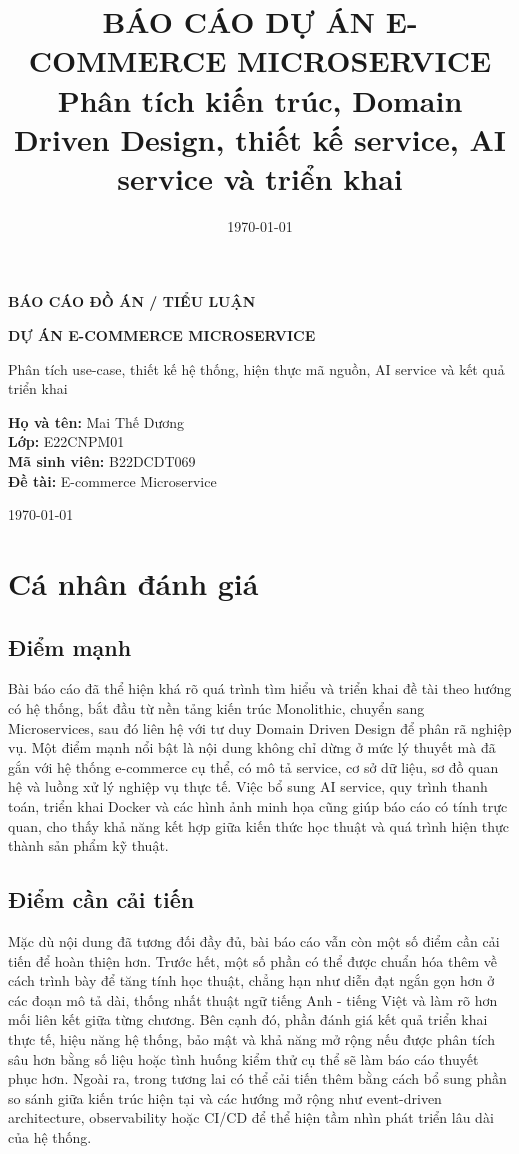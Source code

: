 \documentclass[12pt,a4paper]{article}
\title{\textbf{BÁO CÁO DỰ ÁN E-COMMERCE MICROSERVICE}\\[4pt]
\large Phân tích kiến trúc, Domain Driven Design, thiết kế service, AI service và triển khai}
\author{}
\date{\today}
\begin{document}
\begin{titlepage}
    \centering
    {\Large \textbf{BÁO CÁO ĐỒ ÁN / TIỂU LUẬN}\par}
    \vspace{1.5cm}
    {\LARGE \textbf{DỰ ÁN E-COMMERCE MICROSERVICE}\par}
    \vspace{0.8cm}
    {\large Phân tích use-case, thiết kế hệ thống, hiện thực mã nguồn, AI service và kết quả triển khai\par}
    \vfill
    \begin{flushleft}
        \textbf{Họ và tên:} Mai Thế Dương\\[0.4cm]
        \textbf{Lớp:} E22CNPM01\\[0.4cm]
        \textbf{Mã sinh viên:} B22DCDT069\\[0.4cm]
        \textbf{Đề tài:} E-commerce Microservice
    \end{flushleft}
    \vfill
    {\large \today\par}
\end{titlepage}

\thispagestyle{fancy}

\section*{Cá nhân đánh giá}

\subsection*{Điểm mạnh}
Bài báo cáo đã thể hiện khá rõ quá trình tìm hiểu và triển khai đề tài theo hướng có hệ thống, bắt đầu từ nền tảng kiến trúc Monolithic, chuyển sang Microservices, sau đó liên hệ với tư duy Domain Driven Design để phân rã nghiệp vụ. Một điểm mạnh nổi bật là nội dung không chỉ dừng ở mức lý thuyết mà đã gắn với hệ thống e-commerce cụ thể, có mô tả service, cơ sở dữ liệu, sơ đồ quan hệ và luồng xử lý nghiệp vụ thực tế. Việc bổ sung AI service, quy trình thanh toán, triển khai Docker và các hình ảnh minh họa cũng giúp báo cáo có tính trực quan, cho thấy khả năng kết hợp giữa kiến thức học thuật và quá trình hiện thực thành sản phẩm kỹ thuật.

\subsection*{Điểm cần cải tiến}
Mặc dù nội dung đã tương đối đầy đủ, bài báo cáo vẫn còn một số điểm cần cải tiến để hoàn thiện hơn. Trước hết, một số phần có thể được chuẩn hóa thêm về cách trình bày để tăng tính học thuật, chẳng hạn như diễn đạt ngắn gọn hơn ở các đoạn mô tả dài, thống nhất thuật ngữ tiếng Anh - tiếng Việt và làm rõ hơn mối liên kết giữa từng chương. Bên cạnh đó, phần đánh giá kết quả triển khai thực tế, hiệu năng hệ thống, bảo mật và khả năng mở rộng nếu được phân tích sâu hơn bằng số liệu hoặc tình huống kiểm thử cụ thể sẽ làm báo cáo thuyết phục hơn. Ngoài ra, trong tương lai có thể cải tiến thêm bằng cách bổ sung phần so sánh giữa kiến trúc hiện tại và các hướng mở rộng như event-driven architecture, observability hoặc CI/CD để thể hiện tầm nhìn phát triển lâu dài của hệ thống.
\end{document}
